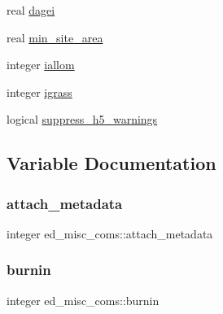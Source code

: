 \begin{DoxyCompactItemize}
\item 
real \hyperlink{namespaceed__misc__coms_a6dedccb6bd1fa55c04ad14eee4ddb95e}{dagei}
\item 
real \hyperlink{namespaceed__misc__coms_ab0d2bac6650ffb4e0fefdb6380ae1c38}{min\+\_\+site\+\_\+area}
\item 
integer \hyperlink{namespaceed__misc__coms_a63c098b4f6d8333d0ce468bc75088832}{iallom}
\item 
integer \hyperlink{namespaceed__misc__coms_a6494bf5748198e80e5a1af43ec3f497f}{igrass}
\item 
logical \hyperlink{namespaceed__misc__coms_ac658bfc9ea442f9905a0a857e1a82f96}{suppress\+\_\+h5\+\_\+warnings}
\end{DoxyCompactItemize}


\subsection{Variable Documentation}
\mbox{\label{namespaceed__misc__coms_afb7de717ec53503d518604da7c021e1a}} 
\subsubsection{\texorpdfstring{attach\+\_\+metadata}{attach\_metadata}}
{\footnotesize\ttfamily integer ed\+\_\+misc\+\_\+coms\+::attach\+\_\+metadata}

\mbox{\label{namespaceed__misc__coms_a9b554bb456be251df521579a073ec34d}} 
\subsubsection{\texorpdfstring{burnin}{burnin}}
{\footnotesize\ttfamily integer ed\+\_\+misc\+\_\+coms\+::burnin}

\mbox{\label{namespaceed__misc__coms_a74892b22b952f148c3ba1bfb0f150692}} 
